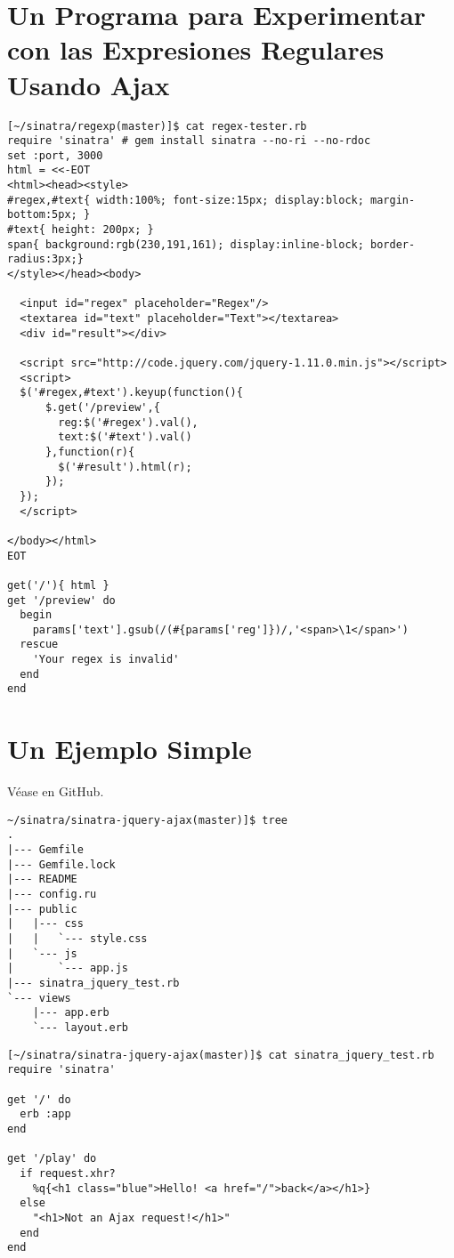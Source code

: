 
\section{Un Programa para Experimentar con las Expresiones Regulares Usando Ajax}


\begin{verbatim}
[~/sinatra/regexp(master)]$ cat regex-tester.rb 
require 'sinatra' # gem install sinatra --no-ri --no-rdoc
set :port, 3000
html = <<-EOT
<html><head><style>
#regex,#text{ width:100%; font-size:15px; display:block; margin-bottom:5px; }
#text{ height: 200px; }
span{ background:rgb(230,191,161); display:inline-block; border-radius:3px;}
</style></head><body>
 
  <input id="regex" placeholder="Regex"/>
  <textarea id="text" placeholder="Text"></textarea>
  <div id="result"></div>
 
  <script src="http://code.jquery.com/jquery-1.11.0.min.js"></script>
  <script>
  $('#regex,#text').keyup(function(){
      $.get('/preview',{
        reg:$('#regex').val(),
        text:$('#text').val()
      },function(r){
        $('#result').html(r);
      });
  });
  </script>
 
</body></html>
EOT
 
get('/'){ html }
get '/preview' do 
  begin
    params['text'].gsub(/(#{params['reg']})/,'<span>\1</span>')
  rescue
    'Your regex is invalid'
  end
end
\end{verbatim}

\section{Un Ejemplo Simple}

Véase 
en GitHub.

\begin{verbatim}
~/sinatra/sinatra-jquery-ajax(master)]$ tree
.
|--- Gemfile
|--- Gemfile.lock
|--- README
|--- config.ru
|--- public
|   |--- css
|   |   `--- style.css
|   `--- js
|       `--- app.js
|--- sinatra_jquery_test.rb
`--- views
    |--- app.erb
    `--- layout.erb
\end{verbatim}

\begin{verbatim}
[~/sinatra/sinatra-jquery-ajax(master)]$ cat sinatra_jquery_test.rb 
require 'sinatra'

get '/' do
  erb :app
end

get '/play' do 
  if request.xhr?
    %q{<h1 class="blue">Hello! <a href="/">back</a></h1>}
  else
    "<h1>Not an Ajax request!</h1>"
  end
end
\end{verbatim}

